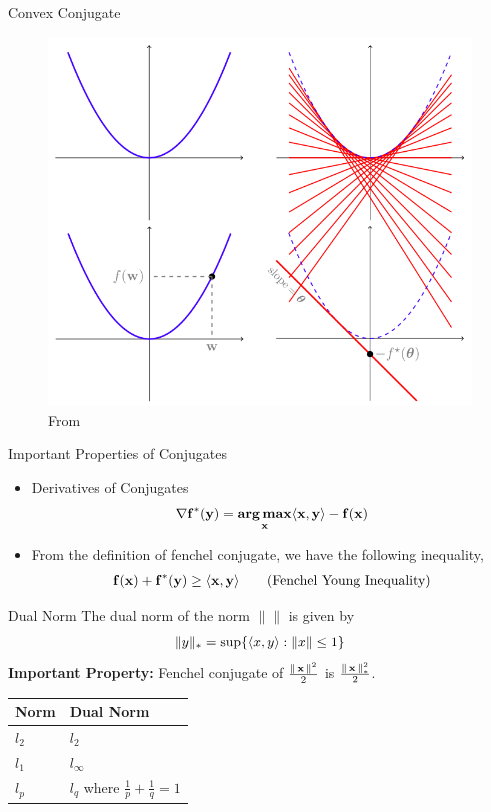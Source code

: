 \begin{frame}{Convex Conjugate}
  \begin{figure}
    \includegraphics[scale=0.27]{images/fenchel.png}
    \caption{From \cite{ShSh2012}}
  \end{figure}
\end{frame}

\begin{frame}{Important Properties of Conjugates}
  \begin{itemize} 
  \item Derivatives of Conjugates
    \begin{align*}
    \nabla {\operatorname{\mathbf{f}}}^{*}(\operatorname{\mathbf{y}}) = \operatorname*{\mathbf{arg\,max}}_{\operatorname{\mathbf{x}}}\langle {\operatorname{\mathbf{x}}} , {\operatorname{\mathbf{y}}} \rangle - \operatorname{\mathbf{f}}(\operatorname{\mathbf{x}})
  \end{align*}  
  \item From the definition of fenchel conjugate, we have the following inequality,
    \begin{align*}
      \operatorname{\mathbf{f}}(\operatorname{\mathbf{x}}) + {\operatorname{\mathbf{f}}}^{*}(\operatorname{\mathbf{y}}) \ge \langle {\operatorname{\mathbf{x}}} , {\operatorname{\mathbf{y}}} \rangle \tag{Fenchel Young Inequality}
    \end{align*}
  \end{itemize}

\end{frame}

\begin{frame}{Dual Norm}
  The dual norm of the norm $\|\|$ is given by
  \begin{align*}
    \|y\|_{*} = \sup\{\langle {x} , {y} \rangle : \|x\| \le 1\}
  \end{align*}
      {\bf Important Property:} Fenchel conjugate of $\frac{\|\operatorname{\mathbf{x}}\|^2}{2}$ is $\frac{\|\operatorname{\mathbf{x}}\|_{*}^2}{2}$.
      \begin{center}
        \begin{tabular}{ll}
          Norm & Dual Norm\\
          \hline
          $l_2$ & $l_2$\\
          $l_1$ & $l_{\infty}$\\
          $l_p$ & $l_q$ where $\frac{1}{p}+\frac{1}{q}=1$\\
        \end{tabular}
      \end{center}
\end{frame}

